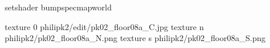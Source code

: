 setshader bumpspecmapworld

texture 0 philipk2/edit/pk02_floor08a_C.jpg
texture n philipk2/pk02_floor08a_N.png
texture s philipk2/pk02_floor08a_S.png

